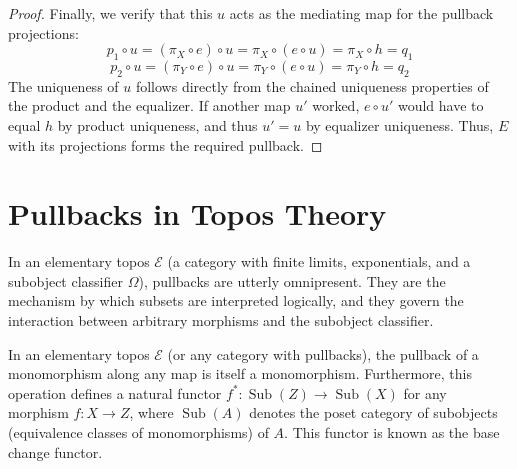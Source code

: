 \begin{proof}
Finally, we verify that this $u$ acts as the mediating map for the pullback projections:
\[
p_1 \circ u = (\pi_X \circ e) \circ u = \pi_X \circ (e \circ u) = \pi_X \circ h = q_1
\]
\[
p_2 \circ u = (\pi_Y \circ e) \circ u = \pi_Y \circ (e \circ u) = \pi_Y \circ h = q_2
\]
The uniqueness of $u$ follows directly from the chained uniqueness properties of the product and the equalizer. If another map $u'$ worked, $e \circ u'$ would have to equal $h$ by product uniqueness, and thus $u' = u$ by equalizer uniqueness. Thus, $E$ with its projections forms the required pullback.
\end{proof}


\section{Pullbacks in Topos Theory}

In an elementary topos $\mathcal{E}$ (a category with finite limits, exponentials, and a subobject classifier $\Omega$), pullbacks are utterly omnipresent. They are the mechanism by which subsets are interpreted logically, and they govern the interaction between arbitrary morphisms and the subobject classifier.

\begin{theorem}
In an elementary topos $\mathcal{E}$ (or any category with pullbacks), the pullback of a monomorphism along any map is itself a monomorphism. Furthermore, this operation defines a natural functor $f^*: \operatorname{Sub}(Z) \to \operatorname{Sub}(X)$ for any morphism $f: X \to Z$, where $\operatorname{Sub}(A)$ denotes the poset category of subobjects (equivalence classes of monomorphisms) of $A$. This functor is known as the base change functor.
\end{theorem}

